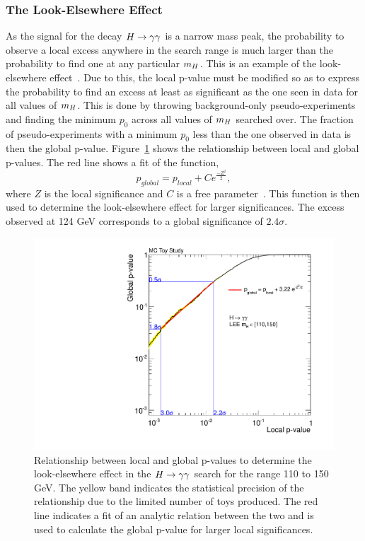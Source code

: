 \subsubsection{The Look-Elsewhere Effect}
 
As the signal for the decay $H\rightarrow\gamma\gamma$ is a narrow mass peak, the probability to observe a local excess
anywhere in the search range is much larger than the probability to find one at any particular $m_{H}$.
This is an example of the look-elsewhere effect~\citep{leelyon}.
Due to this, the local p-value must be modified so as to 
express the probability to find an excess at least as significant as the one seen in data for all values of
$m_{H}$. This is done by throwing background-only pseudo-experiments 
and finding the minimum $p_{0}$ across all values of $m_{H}$ searched over. The fraction of pseudo-experiments with a minimum
$p_{0}$ less than the one observed in data is then the global p-value. 
Figure~\ref{fig:leestudy} shows the relationship between local and global p-values. The red line shows a 
fit of the function,
\begin{equation}
p_{global} = p_{local} + Ce^{ \frac { -Z^{2}} {{2} } },
\label{eqn:lee}
\end{equation}
where $Z$ is the local significance and $C$ is a free parameter~\citep{lee}. This function is then used to 
determine the look-elsewhere effect for larger significances.
The excess observed at 124 GeV corresponds to a global significance of $2.4\sigma$.

\begin{figure}
\begin{center}
  \includegraphics[width=.8\textwidth]{hgg7TeV/statsPlots/lee-extrap.pdf}
\end{center}
 \caption{Relationship between local and global p-values to determine the look-elsewhere effect 
 in the $H\rightarrow\gamma\gamma$ search for the range 110 to 150 GeV.
 The yellow band indicates the statistical precision of the relationship due to the limited number of toys
 produced. The red line indicates a fit of an analytic relation between the two and is used to calculate
 the global p-value for larger local significances.}
 \label{fig:leestudy}
\end{figure}


